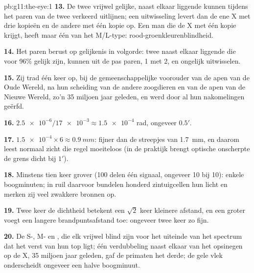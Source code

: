 \begin{solution}{pb:g11:the-eye:1}
\textbf{13.} De twee vrijwel gelijke, naast elkaar liggende  kunnen
tijdens het paren van de twee  verkeerd uitlijnen; een
uitwisseling levert dan de ene X met drie kopieën en de andere met één
kopie op. Een man die de X met één kopie krijgt, heeft maar één 
van het M/L-type: rood-groenkleurenblindheid.

\textbf{14.} Het paren berust op gelijkenis in volgorde: twee naast elkaar
liggende  die voor 96\% gelijk zijn, kunnen uit de pas paren,  1
met  2, en ongelijk uitwisselen.

\textbf{15.} Zij trad één keer op, bij de gemeenschappelijke voorouder van
de apen van de Oude Wereld, na hun scheiding van de andere zoogdieren en
van de apen van de Nieuwe Wereld, zo'n 35 miljoen jaar geleden, en werd
door al hun nakomelingen geërfd.

\textbf{16.} $\num{2.5e-6}/\num{17e-3} \approx \num{1.5e-4}$ rad, ongeveer
$0.5'$.

\textbf{17.} $\num{1.5e-4} \times 6 \approx \qty{0.9}{mm}$: fijner dan de
streepjes van \qty{1.7}{mm}, en daarom leest normaal zicht die regel
moeiteloos (in de praktijk brengt optische onscherpte de grens dicht bij
$1'$).

\textbf{18.} Minstens tien keer grover (100  delen één signaal,
ongeveer 10 bij 10): enkele boogminuten; in ruil daarvoor bundelen honderd
zintuigcellen hun licht en merken zij veel zwakkere bronnen op.

\textbf{19.} Twee keer de dichtheid betekent een $\sqrt{2}$ keer kleinere
afstand, en een groter  voegt een langere brandpuntsafstand toe:
ongeveer twee keer zo fijn.

\textbf{20.} De S-, M- en , die elk vrijwel blind zijn voor het
uiteinde van het spectrum dat het verst van hun top ligt; één verdubbeling
naast elkaar van het opsinegen op de X, 35 miljoen jaar geleden, gaf de
primaten het derde; de gele vlek onderscheidt ongeveer een halve
boogminuut.
\end{solution}
